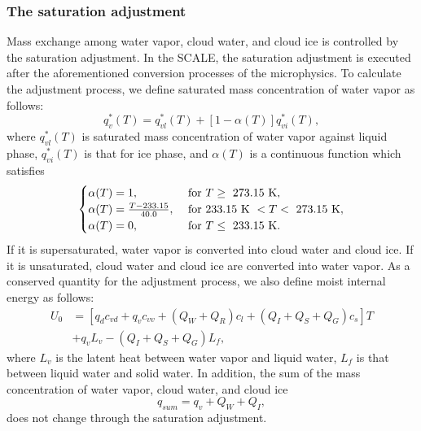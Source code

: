 \subsubsection{The saturation adjustment}
Mass exchange among water vapor, cloud water, and cloud ice is controlled by the saturation adjustment. In the SCALE, the saturation adjustment is executed after the aforementioned conversion processes of the microphysics. To calculate the adjustment process, we define saturated mass concentration of water vapor as follows:
\begin{equation}
  q^{*}_{v}(T) = q^{*}_{vl}(T)+[1-\alpha (T)]q^{*}_{vi}(T)\label{eq:satuqv},
\end{equation}
where $q^{*}_{vl}(T)$ is saturated mass concentration of water vapor against liquid phase, $q^{*}_{vi}(T)$ is that for ice phase, and $\alpha (T)$ is a continuous function which satisfies
\begin{align}
\begin{cases}
  \alpha (T) = 1, & {\rm \ for\ } T \geq {\rm \ 273.15 \ K} ,\\
  \alpha (T) = \frac{T-233.15}{40.0}, & {\rm \ for\ 233.15\ K \ } < T < {\rm \ 273.15 \ K},\\
  \alpha (T) = 0, & {\rm \ for\ } T \leq {\rm \ 233.15 \ K}.
\end{cases}
\end{align}
If it is supersaturated, water vapor is converted into cloud water and cloud ice. If it is unsaturated, cloud water and cloud ice are converted into water vapor. As a conserved quantity for the adjustment process, we also define moist internal energy as follows:
\begin{align}
  U_{0}&=[q_{d}c_{vd}+q_{v}c_{vv}+(Q_{W}+Q_{R})c_{l}+(Q_{I}+Q_{S}+Q_{G})c_{s}]T \nonumber \\ 
  &+q_{v}L_{v}-(Q_{I}+Q_{S}+Q_{G})L_{f},
\end{align}
where $L_{v}$ is the latent heat between water vapor and liquid water, $L_{f}$ is that between liquid water and solid water. In addition, the sum of the mass concentration of water vapor, cloud water, and cloud ice
\begin{equation}
  q_{sum}=q_{v}+Q_{W}+Q_{I},
\end{equation}
does not change through the saturation adjustment.

